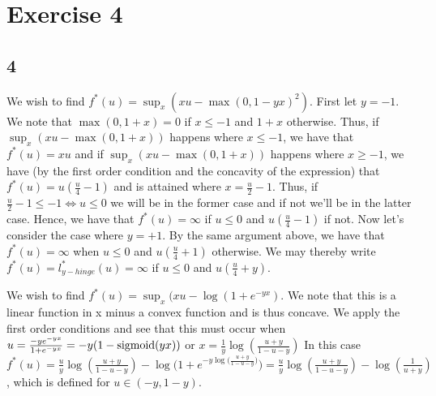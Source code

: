 \documentclass[12pt]{article}
\begin{document}
\section{Exercise 4}
\subsection{4}
We wish to find $f^*(u) = \sup_x (xu - \max(0, 1-yx)^2)$. First let $y=-1$. We note that $\max(0, 1+x) = 0$ if $x\leq -1$ and $1+x$ otherwise. Thus, if $\sup_x (xu-\max(0,1+x))$ happens where $x \leq -1$, we have that $f^*(u) = xu$ and if $\sup_x (xu-\max(0,1+x))$ happens where $x \geq -1$, we have (by the first order condition and the concavity of the expression) that $f^*(u) = u(\frac{u}{4} -1)$ and is attained where $x = \frac{u}{2} -1$. Thus, if $\frac{u}{2} -1 \leq -1 \iff u\leq 0$ we will be in the former case and if not we'll be in the latter case. Hence, we have that $f^*(u) = \infty $ if $u \leq 0$ and $u(\frac{u}{4}-1)$ if not. Now let's consider the case where $y=+1$. By the same argument above, we have that $f^*(u) = \infty$ when $u \leq 0$ and $u(\frac{u}{4} + 1)$ otherwise. We may thereby write $f^*(u) = l_{y-hinge}^*(u) = \infty$ if $u\leq 0$ and $u(\frac{u}{4} + y)$.

We wish to find $f^*(u) = \sup_x(xu - \log(1+e^{-yx})$. We note that this is a linear function in x minus a convex function and is thus concave. We apply the first order conditions and see that this must occur when $u = \frac{-y e^{-yx}}{1+e^{-yx}}  = -y(1-\textnormal{sigmoid}(yx))$ or $x = \frac{1}{y} \log (\frac{u+y}{1-u-y})$ In this case $f^*(u) = \frac{u}{y}\log (\frac{u+y}{1-u-y}) - \log \big(1+ e^{-y\log \big(\frac{u+y}{1-u-y}\big)}\big) = \frac{u}{y} \log(\frac{u+y}{1-u-y}) - \log (\frac{1}{u+y})$, which is defined for $u \in (-y, 1-y)$. 
\end{document}
